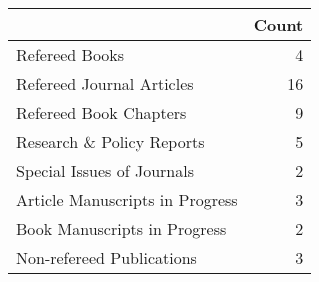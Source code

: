 \begin{tabular}{lr}
\toprule
 & Count \\
\midrule
Refereed Books & 4 \\
Refereed Journal Articles & 16 \\
Refereed Book Chapters & 9 \\
Research \& Policy Reports & 5 \\
Special Issues of Journals & 2 \\
Article Manuscripts in Progress & 3 \\
Book Manuscripts in Progress & 2 \\
Non-refereed Publications & 3 \\
\bottomrule
\end{tabular}
